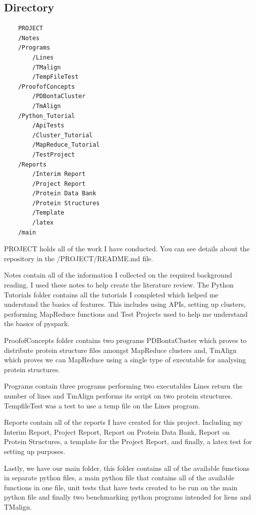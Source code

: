 \documentclass[]{final_report}
\begin{document}
\subsection{Directory}

\begin{lstlisting}
    PROJECT
    /Notes
    /Programs
        /Lines
        /TMalign
        /TempFileTest
    /ProofofConcepts
        /PDBontaCluster
        /TmAlign
    /Python_Tutorial
        /ApiTests
        /Cluster_Tutorial
        /MapReduce_Tutorial
        /TestProject
    /Reports
        /Interim Report
        /Project Report
        /Protein Data Bank
        /Protein Structures
        /Template
        /latex
    /main
\end{lstlisting}

PROJECT holds all of the work I have conducted. You can see details about the repository in the /PROJECT/README.md file.

Notes contain all of the information I collected on the required background reading. I used these notes to help create the literature review. The Python Tutorials folder contains all the tutorials I completed which helped me understand the basics of features. This includes using APIs, setting up clusters, performing MapReduce functions and Test Projects used to help me understand the basics of pyspark.

ProofofConcepts folder contains two programs PDBontaCluster which proves to distribute protein structure files amongst MapReduce clusters and, TmAlign which proves we can MapReduce using a single type of executable for analysing protein structures.

\clearpage

Programs contain three programs performing two executables Lines return the number of lines and TmAlign performs its script on two protein structures. TempfileTest was a test to use a temp file on the Lines program.

Reports contain all of the reports I have created for this project. Including my Interim Report, Project Report, Report on Protein Data Bank, Report on Protein Structures, a template for the Project Report, and finally, a latex test for setting up purposes.

Lastly, we have our main folder, this folder contains all of the available functions in separate python files, a main python file that contains all of the available functions in one file, unit tests that have tests created to be run on the main python file and finally two benchmarking python programs intended for liens and TMalign.
\end{document}
